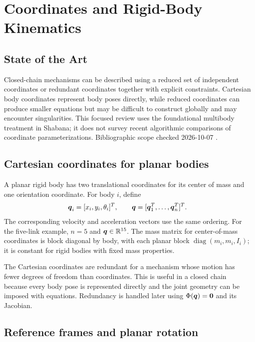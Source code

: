 \documentclass[../main.tex]{subfiles}
\begin{document}
\chapter{Coordinates and Rigid-Body Kinematics}
\label{chap:coordinates}

\section{State of the Art}
Closed-chain mechanisms can be described using a reduced set of independent coordinates or redundant coordinates together with explicit constraints. Cartesian body coordinates represent body poses directly, while reduced coordinates can produce smaller equations but may be difficult to construct globally and may encounter singularities. This focused review uses the foundational multibody treatment in Shabana; it does not survey recent algorithmic comparisons of coordinate parameterizations. Bibliographic scope checked 2026-10-07 \cite{shabana2013dynamics}.

\section{Cartesian coordinates for planar bodies}

A planar rigid body has two translational coordinates for its center of mass and one orientation coordinate. For body $i$, define
\begin{equation}
	\boldsymbol{q}_i=[x_i,y_i,\theta_i]^T,
	\qquad
	\boldsymbol{q}=[\boldsymbol{q}_1^T,\ldots,\boldsymbol{q}_n^T]^T.
	\label{eq:planar-body-coordinates}
\end{equation}
The corresponding velocity and acceleration vectors use the same ordering. For the five-link example, $n=5$ and $\boldsymbol{q}\in\mathbb{R}^{15}$. The mass matrix for center-of-mass coordinates is block diagonal by body, with each planar block $\operatorname{diag}(m_i,m_i,I_i)$; it is constant for rigid bodies with fixed mass properties.

The Cartesian coordinates are redundant for a mechanism whose motion has fewer degrees of freedom than coordinates. This is useful in a closed chain because every body pose is represented directly and the joint geometry can be imposed with equations. Redundancy is handled later using $\Phi(\boldsymbol{q})=\boldsymbol{0}$ and its Jacobian.

\section{Reference frames and planar rotation}
\end{document}
